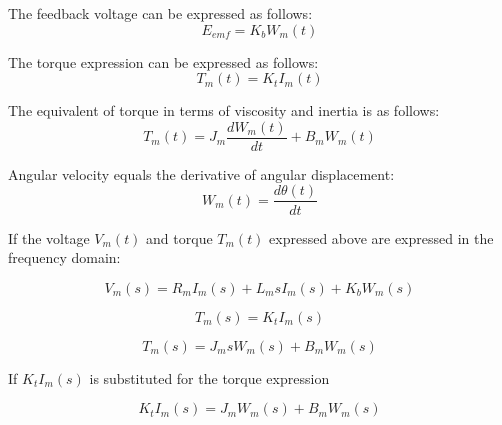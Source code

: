     The feedback voltage can be expressed as follows: 
        \begin{equation}
            E_{emf} = K_b W_m(t)
            \label{eqfeedback_voltage }
            \end{equation}

    The torque expression can be expressed as follows: 
            \begin{equation}
                T_m(t) = K_t I_m(t)
                \label{eq:torque_expression }
                \end{equation}

    The equivalent of torque in terms of viscosity and inertia is as follows:
            \begin{equation}
                T_m(t) = J_m \frac{d W_m(t)}{dt} + B_m W_m(t)
                \label{eq:mechanical_dynamics}
                \end{equation}
        

    Angular velocity equals the derivative of angular displacement:
            \begin{equation}
               W_m(t) = \frac{d \theta(t)}{dt}
                \label{eq:angular_velocity}
                \end{equation}
        

    If the voltage \( V_m(t) \) and torque \( T_m(t) \) expressed above are expressed in the frequency domain:
 
            \begin{equation}
                V_m(s) = R_m I_m(s) + L_m s I_m(s) + K_b W_m(s)
                \label{eq:voltage_laplace}
                \end{equation}
        
                \begin{equation}
                    T_m(s) = K_t I_m(s)
                    \label{eq:torque_current_laplace}
                    \end{equation}
                    
                \begin{equation}
                    T_m(s) = J_m s W_m(s) + B_m W_m(s)
                    \label{eq:mechanical_laplace}
                    \end{equation}
                        

    If \( K_t I_m(s) \) is substituted for the torque expression 

                \begin{equation}
                    K_t I_m(s) = J_m  W_m(s) + B_m W_m(s)
                    \label{eq:substituted_torque}
                    \end{equation}
        

